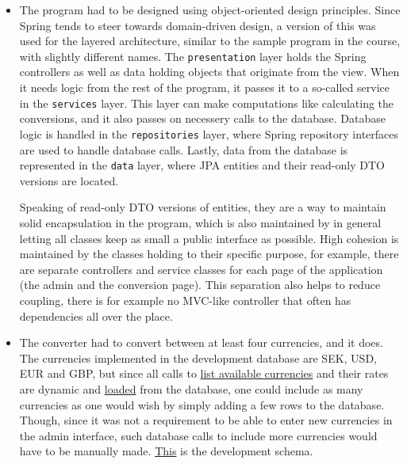 \documentclass[a4paper]{scrartcl}
\def\code#1{\texttt{#1}}
\begin{document}
\begin{itemize}
    \item The program had to be designed using object-oriented design principles. Since Spring tends to steer towards domain-driven design, a version of this was used for the layered architecture, similar to the sample program in the course, with slightly different names. The \code{presentation} layer holds the Spring controllers as well as data holding objects that originate from the view. When it needs logic from the rest of the program, it passes it to a so-called service in the \code{services} layer. This layer can make computations like calculating the conversions, and it also passes on necessery calls to the database. Database logic is handled in the \code{repositories} layer, where Spring repository interfaces are used to handle database calls. Lastly, data from the database is represented in the \code{data} layer, where JPA entities and their read-only DTO versions are located.

        Speaking of read-only DTO versions of entities, they are a way to maintain solid encapsulation in the program, which is also maintained by in general letting all classes keep as small a public interface as possible. High cohesion is maintained by the classes holding to their specific purpose, for example, there are separate controllers and service classes for each page of the application (the admin and the conversion page). This separation also helps to reduce coupling, there is for example no MVC-like controller that often has dependencies all over the place.

    \item The converter had to convert between at least four currencies, and it does. The currencies implemented in the development database are SEK, USD, EUR and GBP, but since all calls to \href{https://github.com/fongie/CurrencyConverter/blob/master/currencyconverter/src/main/resources/templates/convert.html#L40}{list available currencies} and their rates are dynamic and \href{https://github.com/fongie/CurrencyConverter/blob/master/currencyconverter/src/main/java/se/kth/korlinge/currencyconverter/services/ConvertService.java#L70}{loaded} from the database, one could include as many currencies as one would wish by simply adding a few rows to the database. Though, since it was not a requirement to be able to enter new currencies in the admin interface, such database calls to include more currencies would have to be manually made. \href{https://github.com/fongie/CurrencyConverter/blob/master/currencyconverter/src/main/resources/schema.sql}{This} is the development schema.


\end{itemize}
\end{document}
